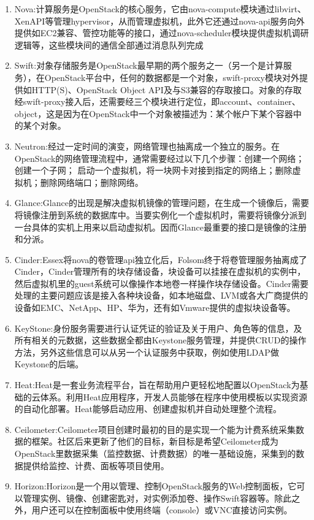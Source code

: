 \begin{enumerate}
\item Nova:计算服务是OpenStack的核心服务，它由nova-compute模块通过libvirt、XenAPI等管理hypervisor，从而管理虚拟机，此外它还通过nova-api服务向外提供如EC2兼容、管控功能等的接口，通过nova-scheduler模块提供虚拟机调研逻辑等，这些模块间的通信全部通过消息队列完成
\item Swift:对象存储服务是OpenStack最早期的两个服务之一（另一个是计算服务），在OpenStack平台中，任何的数据都是一个对象，swift-proxy模块对外提供如HTTP(S)、OpenStack Object API及与S3兼容的存取接口。对象的存取经swift-proxy接入后，还需要经三个模块进行定位，即account、container、object，这是因为在OpenStack中一个对象被描述为：某个帐户下某个容器中的某个对象。
\item Neutron:经过一定时间的演变，网络管理也抽离成一个独立的服务。在OpenStack的网络管理流程中，通常需要经过以下几个步骤：创建一个网络； 创建一个子网； 启动一个虚拟机，将一块网卡对接到指定的网络上；删除虚拟机；删除网络端口；删除网络。
\item Glance:Glance的出现是解决虚拟机镜像的管理问题，在生成一个镜像后，需要将镜像注册到系统的数据库中。当要实例化一个虚拟机时，需要将镜像分派到一台具体的实机上用来以启动虚拟机。因而Glance最重要的接口是镜像的注册和分派。
\item Cinder:Essex将nova的卷管理api独立化后，Folsom终于将卷管理服务抽离成了Cinder，Cinder管理所有的块存储设备，块设备可以挂接在虚拟机的实例中，然后虚拟机里的guest系统可以像操作本地卷一样操作块存储设备。Cinder需要处理的主要问题应该是接入各种块设备，如本地磁盘、LVM或各大广商提供的设备如EMC、NetApp、HP、华为，还有如Vmware提供的虚拟块设备等。
\item KeyStone:身份服务需要进行认证凭证的验证及关于用户、角色等的信息，及所有相关的元数据，这些数据全都由Keystone服务管理，并提供CRUD的操作方法，另外这些信息可以从另一个认证服务中获取，例如使用LDAP做Keystone的后端。
\item Heat:Heat是一套业务流程平台，旨在帮助用户更轻松地配置以OpenStack为基础的云体系。利用Heat应用程序，开发人员能够在程序中使用模板以实现资源的自动化部署。Heat能够启动应用、创建虚拟机并自动处理整个流程。
\item Ceilometer:Ceilometer项目创建时最初的目的是实现一个能为计费系统采集数据的框架。社区后来更新了他们的目标，新目标是希望Ceilometer成为OpenStack里数据采集（监控数据、计费数据）的唯一基础设施，采集到的数据提供给监控、计费、面板等项目使用。
\item Horizon:Horizon是一个用以管理、控制OpenStack服务的Web控制面板，它可以管理实例、镜像、创建密匙对，对实例添加卷、操作Swift容器等。除此之外，用户还可以在控制面板中使用终端（console）或VNC直接访问实例。
\end{enumerate}
